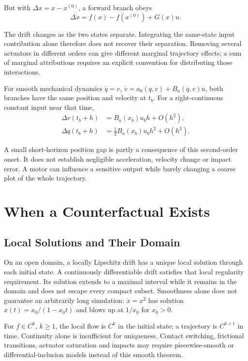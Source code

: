 But with $\Delta x=x-x^{(0)}$, a forward branch obeys
\begin{equation}
\Delta\dot x=f(x)-f(x^{(0)})+G(x)u.
\label{eq:ch7:branch-difference}
\end{equation}

The drift changes as the two states separate. Integrating the same-state input contribution alone therefore does not recover their separation. Removing several actuators in different orders can give different marginal trajectory effects; a sum of marginal attributions requires an explicit convention for distributing those interactions.

For smooth mechanical dynamics $\dot q=v$, $\dot v=a_0(q,v)+B_a(q,v)u$, both branches have the same position and velocity at $t_b$. For a right-continuous constant input near that time,
\begin{equation}
\begin{aligned}
\Delta v(t_b+h)&=B_a(x_b)u_bh+O(h^2),\\
\Delta q(t_b+h)&=\tfrac12 B_a(x_b)u_bh^2+O(h^3).
\end{aligned}
\label{eq:ch7:short-horizon}
\end{equation}

A small short-horizon position gap is partly a consequence of this second-order onset. It does not establish negligible acceleration, velocity change or impact error. A motor can influence a sensitive output while barely changing a coarse plot of the whole trajectory.

\section{When a Counterfactual Exists}
\label{sec:ch7:existence}

\subsection{Local Solutions and Their Domain}
\label{thm:ch7:picard-lindelof}
On an open domain, a locally Lipschitz drift has a unique local solution through each initial state. A continuously differentiable drift satisfies that local regularity requirement. Its solution extends to a maximal interval while it remains in the domain and does not escape every compact subset. Smoothness alone does not guarantee an arbitrarily long simulation: $\dot x=x^2$ has solution $x(t)=x_0/(1-x_0t)$ and blows up at $1/x_0$ for $x_0>0$.

\label{cor:ch7:ZTCF-smooth}
For $f\in C^k$, $k\geq1$, the local flow is $C^k$ in the initial state; a trajectory is $C^{k+1}$ in time. Continuity alone is insufficient for uniqueness. Contact switching, frictional transitions, actuator saturation and impacts may require piecewise-smooth or differential-inclusion models instead of this smooth theorem.

